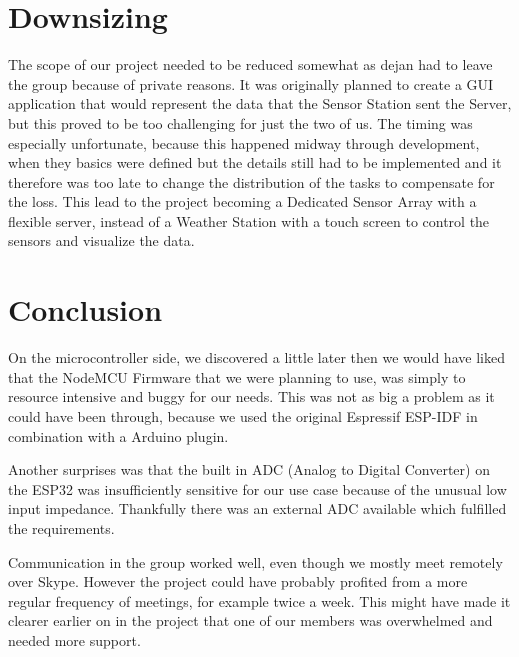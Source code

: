 \newpage
\section{Downsizing}
The scope of our project needed to be reduced somewhat as dejan had to leave the group because of private reasons.
It was originally planned to create a GUI application that would represent the data that the Sensor Station sent the Server, but this proved to be too challenging for just the two of us.
The timing was especially unfortunate, because this happened midway through development, when they basics were defined but the details still had to be implemented and it therefore was too late to change the distribution of the tasks to compensate for the loss.
This lead to the project becoming a Dedicated Sensor Array with a flexible server, instead of a Weather Station with a touch screen to control the sensors and visualize the data.

\section{Conclusion}
On the microcontroller side, we discovered a little later then we would have liked that the NodeMCU Firmware that we were planning to use, was simply to resource intensive and buggy for our needs. This was not as big a problem as it could have been through, because we used the original Espressif ESP-IDF in combination with a Arduino plugin.

Another surprises was that the built in ADC (Analog to Digital Converter) on the ESP32 was insufficiently sensitive for our use case because of the unusual low input impedance. Thankfully there was an external ADC available which fulfilled the requirements.

Communication in the group worked well, even though we mostly meet remotely over Skype. However the project could have probably profited from a more regular frequency of meetings, for example twice a week. This might have made it clearer earlier on in the project that one of our members was overwhelmed and needed more support.
\newpage
